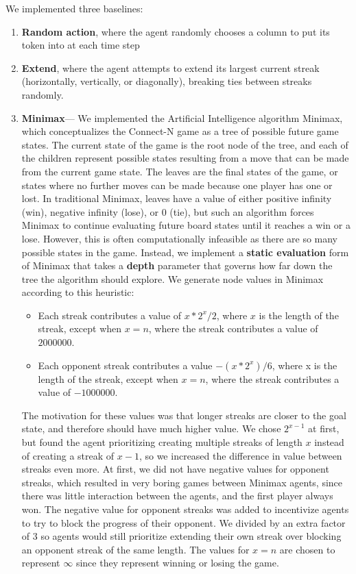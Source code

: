 \documentclass[12pt]{article}
\begin{document}
We implemented three baselines:
\begin{enumerate}
\item \textbf{Random action}, where the agent randomly chooses a column to put its token into at each time step
\item \textbf{Extend}, where the agent attempts to extend its largest current streak (horizontally, vertically, or diagonally), breaking ties between streaks randomly.
\item \textbf{Minimax}--- We implemented the Artificial Intelligence algorithm Minimax, which conceptualizes the Connect-N game as a tree of possible future game states. The current state of the game is the root node of the tree, and each of the children represent possible states resulting from a move that can be made from the current game state. The leaves are the final states of the game, or states where no further moves can be made because one player has one or lost. In traditional Minimax, leaves have a value of either positive infinity (win), negative infinity (lose), or 0 (tie), but such an algorithm forces Minimax to continue evaluating future board states until it reaches a win or a lose. However, this is often computationally infeasible as there are so many possible states in the game. Instead, we implement a \textbf{static evaluation} form of Minimax that takes a \textbf{depth} parameter that governs how far down the tree the algorithm should explore. We generate node values in Minimax according to this heuristic:

\begin{itemize}

\item Each streak contributes a value of $x * 2^x/2$, where $x$ is the length of the streak, except when $x = n$, where the streak contributes a value of $2000000$.
\item Each opponent streak contributes a value $-(x *  2^x) / 6$, where x is the length of the streak, except when $x = n$, where the streak contributes a value of $-1000000$.
\end{itemize}
The motivation for these values was that longer streaks are closer to the goal state, and therefore should have much higher value. We chose $2^{x-1}$ at first, but found the agent prioritizing creating multiple streaks of length $x$ instead of creating a streak of $x-1$, so we increased the difference in value between streaks even more. At first, we did not have negative values for opponent streaks, which resulted in very boring games between Minimax agents, since there was little interaction between the agents, and the first player always won. The negative value for opponent streaks was added to incentivize agents to try to block the progress of their opponent. We divided by an extra factor of 3 so agents would still prioritize extending their own streak over blocking an opponent streak of the same length. The values for $x=n$ are chosen to represent $\infty$ since they represent winning or losing the game.


\end{enumerate}
\end{document}
